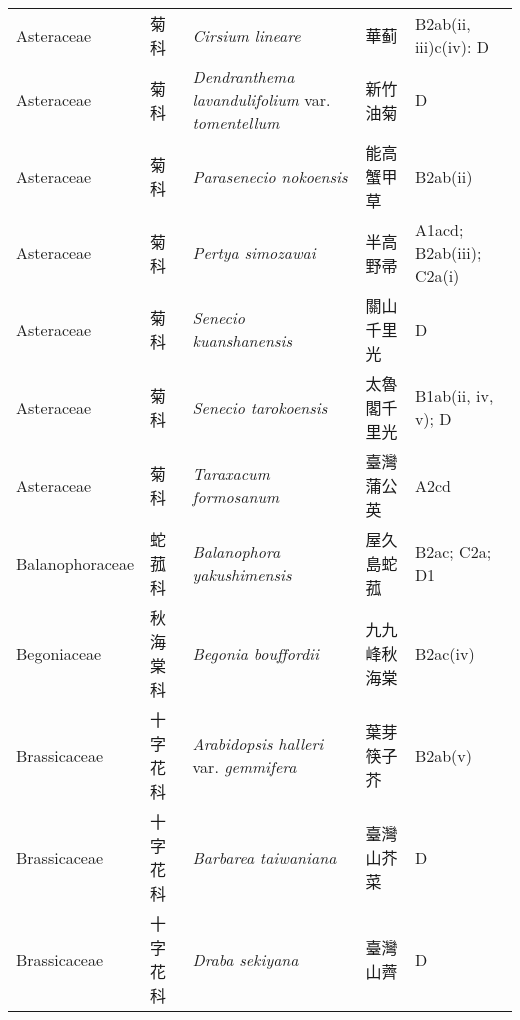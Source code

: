 {\begin{longtable}{p{2.5cm}p{2.5cm}p{4.5cm}p{2.5cm}p{3cm}}
    Asteraceae & 菊科 & \textit{Cirsium lineare}  & 華蓟 & B2ab(ii, iii)c(iv): D \index{Cirsium@\textit{Cirsium}!lineare@\textit{lineare}}  \index{華蓟} \\
    Asteraceae & 菊科 & \textit{Dendranthema lavandulifolium} var. \textit{tomentellum}  & 新竹油菊 & D \index{Dendranthema@\textit{Dendranthema}!lavandulifolium@\textit{lavandulifolium}!var. tomentellum@var. \textit{tomentellum}}  \index{新竹油菊} \\
    Asteraceae & 菊科 & \textit{Parasenecio nokoensis}  & 能高蟹甲草 & B2ab(ii) \index{Parasenecio@\textit{Parasenecio}!nokoensis@\textit{nokoensis}}  \index{能高蟹甲草} \\
    Asteraceae & 菊科 & \textit{Pertya simozawai}  & 半高野帚 & A1acd; B2ab(iii); C2a(i) \index{Pertya@\textit{Pertya}!simozawai@\textit{simozawai}}  \index{半高野帚} \\
    Asteraceae & 菊科 & \textit{Senecio kuanshanensis}  & 關山千里光 & D \index{Senecio@\textit{Senecio}!kuanshanensis@\textit{kuanshanensis}}  \index{關山千里光} \\
    Asteraceae & 菊科 & \textit{Senecio tarokoensis}  & 太魯閣千里光 & B1ab(ii, iv, v); D \index{Senecio@\textit{Senecio}!tarokoensis@\textit{tarokoensis}}  \index{太魯閣千里光} \\
    Asteraceae & 菊科 & \textit{Taraxacum formosanum}  & 臺灣蒲公英 & A2cd \index{Taraxacum@\textit{Taraxacum}!formosanum@\textit{formosanum}}  \index{臺灣蒲公英} \\
    Balanophoraceae & 蛇菰科 & \textit{Balanophora yakushimensis}  & 屋久島蛇菰 & B2ac; C2a; D1 \index{Balanophora@\textit{Balanophora}!yakushimensis@\textit{yakushimensis}}  \index{屋久島蛇菰} \\
    Begoniaceae & 秋海棠科 & \textit{Begonia bouffordii}  & 九九峰秋海棠 & B2ac(iv) \index{Begonia@\textit{Begonia}!bouffordii@\textit{bouffordii}}  \index{九九峰秋海棠} \\
    Brassicaceae & 十字花科 & \textit{Arabidopsis halleri} var. \textit{gemmifera}  & 葉芽筷子芥 & B2ab(v) \index{Arabidopsis@\textit{Arabidopsis}!halleri@\textit{halleri}!var. gemmifera@var. \textit{gemmifera}}  \index{葉芽筷子芥} \\
    Brassicaceae & 十字花科 & \textit{Barbarea taiwaniana}  & 臺灣山芥菜 & D \index{Barbarea@\textit{Barbarea}!taiwaniana@\textit{taiwaniana}}  \index{臺灣山芥菜} \\
    Brassicaceae & 十字花科 & \textit{Draba sekiyana}  & 臺灣山薺 & D \index{Draba@\textit{Draba}!sekiyana@\textit{sekiyana}}  \index{臺灣山薺} \\

\end{longtable}}
